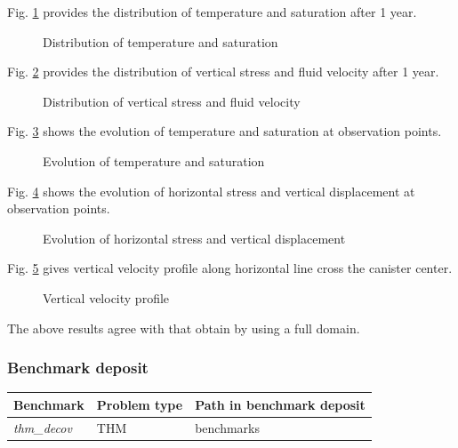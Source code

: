 Fig. \ref{fig_THMdTS} provides the distribution of temperature and saturation after 1 year.
\begin{figure}[H]
  \begin{center}
  \end{center}
  \caption{Distribution of temperature and saturation}
  \label{fig_THMdTS}
\end{figure}
Fig. \ref{fig_THMdSV} provides the distribution of vertical stress and fluid velocity after 1 year.
\begin{figure}[H]
  \begin{center}
  \end{center}
  \caption{Distribution of vertical stress and fluid velocity}
  \label{fig_THMdSV}
\end{figure}
Fig. \ref{fig_THMvts_t} shows the evolution of temperature and saturation at observation points.
\begin{figure}[H]
  \begin{center}
  \end{center}
  \caption{Evolution of temperature and saturation}
  \label{fig_THMvts_t}
\end{figure}
Fig. \ref{fig_THMvsu_t} shows the evolution of horizontal stress and vertical displacement at observation points.
\begin{figure}[H]
  \begin{center}
  \end{center}
  \caption{Evolution of horizontal stress and vertical displacement}
  \label{fig_THMvsu_t}
\end{figure}
Fig. \ref{fig_THMvel} gives vertical velocity profile along horizontal line cross the canister center.
\begin{figure}[H]
  \begin{center}
  \end{center}
  \caption{Vertical velocity profile}
  \label{fig_THMvel}
\end{figure}
The above results agree with that obtain by using a full domain.

\subsubsection*{Benchmark deposit}
\begin{tabular}{|l|l|l|}
  \hline
  Benchmark & Problem type & Path in benchmark deposit \\
  \hline
 \emph{thm\_decov}& THM & benchmarks\verb \THM\ \\
  \hline
\end{tabular}


